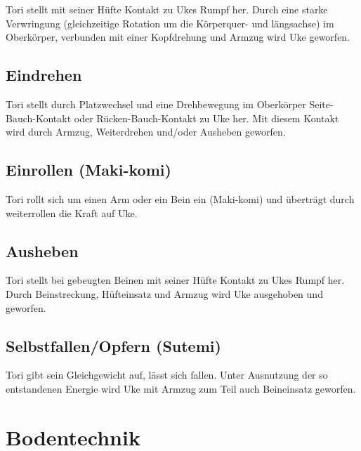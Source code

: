 \documentclass[justified, a4paper, notitlepage, captions=tableheading, nobib]{tufte-handout}
\begin{document}
Tori stellt mit seiner Hüfte Kontakt zu Ukes Rumpf her. Durch eine starke Verwringung (gleichzeitige
Rotation um die Körperquer- und längsachse) im Oberkörper, verbunden mit einer Kopfdrehung und
Armzug wird Uke geworfen.

\subsection{Eindrehen}
\label{sec:orgcb43f54}

Tori stellt durch Platzwechsel und eine Drehbewegung im Oberkörper Seite-Bauch-Kontakt oder
Rücken-Bauch-Kontakt zu Uke her. Mit diesem Kontakt wird durch Armzug, Weiterdrehen und/oder
Ausheben geworfen.

\subsection{Einrollen (Maki-komi)}
\label{sec:orgc7c83d4}

Tori rollt sich um einen Arm oder ein Bein ein (Maki-komi) und überträgt durch weiterrollen die Kraft
auf Uke.

\subsection{Ausheben}
\label{sec:org51022ac}

Tori stellt bei gebeugten Beinen mit seiner Hüfte Kontakt zu Ukes Rumpf her. Durch Beinstreckung,
Hüfteinsatz und Armzug wird Uke ausgehoben und geworfen.

\subsection{Selbstfallen/Opfern (Sutemi)}
\label{sec:orge2a23d8}

Tori gibt sein Gleichgewicht auf, lässt sich fallen. Unter Ausnutzung der so entstandenen Energie
wird Uke mit Armzug zum Teil auch Beineinsatz geworfen.


\newpage
\section{Bodentechnik }
\label{sec:org2ecca59}
\end{document}
